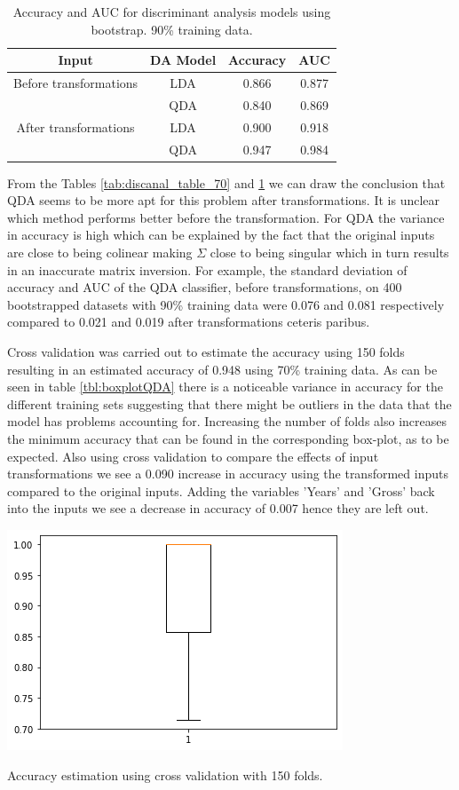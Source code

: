 \documentclass[../../project.tex]{subfiles}
\begin{document}
		\begin{table}[h!]
		\centering
		\begin{tabular}{cccc}
			Input & DA Model & Accuracy & AUC \\
			\midrule
			Before transformations
			& LDA & 0.866 & 0.877 \\
		    & QDA & 0.840 & 0.869 \\
			\midrule
			After transformations
			& LDA & 0.900 & 0.918 \\
			& QDA & 0.947 & 0.984 \\
		\end{tabular}
		\caption{Accuracy and AUC for discriminant analysis models using bootstrap. 90\% training data.}
		\label{tab:discanal_table_90}
	\end{table}
	From the Tables \ref{tab:discanal_table_70} and \ref{tab:discanal_table_90} we can draw the conclusion that QDA seems to be more apt for this problem after transformations. It is unclear which method performs better before the transformation. For QDA the variance in accuracy is high which can be explained by the fact that the original inputs are close to being colinear making $\Sigma$ close to being singular which in turn results in an inaccurate matrix inversion. For example, the standard deviation of accuracy and AUC of the QDA classifier, before transformations, on 400 bootstrapped datasets with 90\% training data were 0.076 and 0.081 respectively compared to 0.021 and 0.019 after transformations ceteris paribus.
	
	Cross validation was carried out to estimate the accuracy using 150 folds resulting in an estimated accuracy of 0.948 using 70\% training data. As can be seen in table \ref{tbl:boxplotQDA} there is a noticeable variance in accuracy for the different training sets suggesting that there might be outliers in the data that the model has problems accounting for. Increasing the number of folds also increases the minimum accuracy that can be found in the corresponding box-plot, as to be expected. Also using cross validation to compare the effects of input transformations we see a 0.090 increase in accuracy using the transformed inputs compared to the original inputs. Adding the variables 'Years' and 'Gross' back into the inputs we see a decrease in accuracy of 0.007 hence they are left out.

	\begin{table}[h!]
		\centering
    	\includegraphics[scale=0.7]{project/tex/QDAboxplot.png}
		\caption{Accuracy estimation using cross validation with 150 folds.}
		\label{tbl:boxplotQDA}
    \end{table}
    
\end{document}
